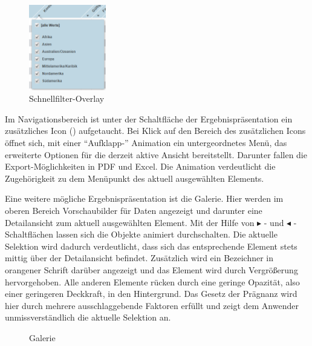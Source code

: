 \begin{figure}[H]
 \centering
 \includegraphics[width=0.3\textwidth]{grafiken/overlay.png}
 \caption{Schnellfilter-Overlay}
 \label{fig:autofilter}
\end{figure}
Im Navigationsbereich ist unter der Schaltfläche der Ergebnispräsentation ein zusätzliches Icon () aufgetaucht. Bei Klick auf den Bereich des zusätzlichen Icons öffnet sich, mit einer \enquote{Aufklapp-} Animation ein untergeordnetes Menü, das erweiterte Optionen für die derzeit aktive Ansicht bereitstellt. Darunter fallen die Export-Möglichkeiten in PDF und Excel. Die Animation verdeutlicht die Zugehörigkeit zu dem Menüpunkt des aktuell ausgewählten Elements.\par%
Eine weitere mögliche Ergebnispräsentation ist die Galerie. Hier werden im oberen Bereich Vorschaubilder für Daten angezeigt und darunter eine Detailansicht zum aktuell ausgewählten Element. Mit der Hilfe von $\blacktriangleright$ - und $\blacktriangleleft$ - Schaltflächen lassen sich die Objekte animiert durchschalten. Die aktuelle Selektion wird dadurch verdeutlicht, dass sich das entsprechende Element stets mittig über der Detailansicht befindet. Zusätzlich wird ein Bezeichner in orangener Schrift darüber angezeigt und das Element wird durch Vergrößerung hervorgehoben. Alle anderen Elemente rücken durch eine geringe Opazität, also einer geringeren Deckkraft, in den Hintergrund. Das Gesetz der Prägnanz wird hier durch mehrere ausschlaggebende Faktoren erfüllt und zeigt dem Anwender unmissverständlich die aktuelle Selektion an.\par
\begin{figure}[H]
 \centering
 \setlength{\fboxsep}{0pt}
 \setlength{\fboxrule}{0.5pt}
 \caption{Galerie}
 \label{fig:gallery}
\end{figure}
